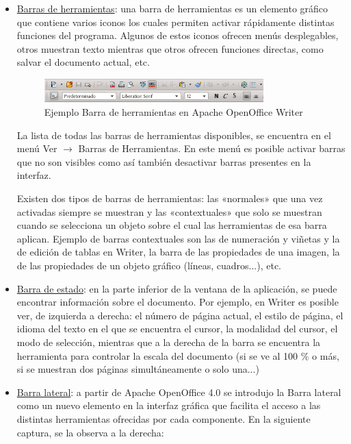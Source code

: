 \documentclass[12pt]{article}
\begin{document}
\begin{itemize}
\item \underline{Barras de herramientas}: una barra de herramientas es un elemento gráfico que contiene varios iconos los cuales permiten activar rápidamente distintas funciones del programa. Algunos de estos iconos ofrecen menús desplegables, otros muestran texto mientras que otros ofrecen funciones directas, como salvar el documento actual, etc.

\begin{figure}[h]
\centering
\includegraphics[width=0.8\textwidth]{barraHerramientaOO.png}
\renewcommand{\figurename}{Fig.}
\caption{Ejemplo Barra de herramientas en Apache OpenOffice Writer}
\label{contexto:figura}
\end{figure}

La lista de todas las barras de herramientas disponibles, se encuentra en el menú Ver $\rightarrow $ Barras de Herramientas. En este menú es posible activar barras que no son visibles como así también desactivar barras presentes en la interfaz.

Existen dos tipos de barras de herramientas: las «normales» que una vez activadas siempre se muestran y las «contextuales» que solo se muestran cuando se selecciona un objeto sobre el cual las herramientas de esa barra aplican. Ejemplo de barras contextuales son las de numeración y viñetas y la de edición de tablas en Writer, la barra de las propiedades de una imagen, la de las propiedades de un objeto gráfico (líneas, cuadros...), etc.

\item \underline{Barra de estado}: en la parte inferior de la ventana de la aplicación, se puede encontrar información sobre el documento. Por ejemplo, en Writer es posible ver, de izquierda a derecha: el número de página actual, el estilo de página, el idioma del texto en el que se encuentra el cursor, la modalidad del cursor, el modo de selección, mientras que a la derecha de la barra se encuentra la herramienta para controlar la escala del documento (si se ve al 100 \% o más, si se muestran dos páginas simultáneamente o solo una...)

\item \underline{Barra lateral}: a partir de Apache OpenOffice 4.0 se introdujo la Barra lateral como un nuevo elemento en la interfaz gráfica que facilita el acceso a las distintas herramientas ofrecidas por cada componente. En la siguiente captura, se la observa a la derecha:


\end{itemize}
\end{document}
